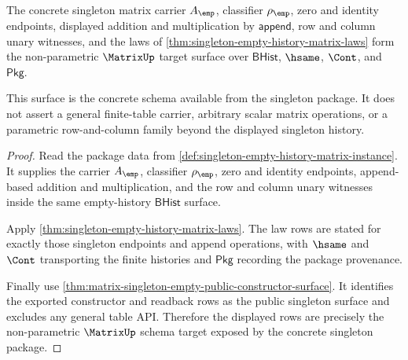 \begin{theorem}
\label{thm:matrix-singleton-concrete-schema-surface}
The concrete singleton matrix carrier $A_{\emp}$, classifier $\rho_{\emp}$,
zero and identity endpoints, displayed addition and multiplication by
$\mathsf{append}$, row and column unary witnesses, and the laws of
\autoref{thm:singleton-empty-history-matrix-laws} form the non-parametric
$\MatrixUp$ target surface over $\mathsf{BHist}$, $\hsame$, $\Cont$, and
$\mathsf{Pkg}$.

This surface is the concrete schema available from the singleton package. It
does not assert a general finite-table carrier, arbitrary scalar matrix
operations, or a parametric row-and-column family beyond the displayed singleton
history.
\end{theorem}
\begin{proof}
Read the package data from
\autoref{def:singleton-empty-history-matrix-instance}. It supplies the carrier
$A_{\emp}$, classifier $\rho_{\emp}$, zero and identity endpoints, append-based
addition and multiplication, and the row and column unary witnesses inside the
same empty-history $\mathsf{BHist}$ surface.

Apply \autoref{thm:singleton-empty-history-matrix-laws}. The law rows are stated
for exactly those singleton endpoints and append operations, with $\hsame$ and
$\Cont$ transporting the finite histories and $\mathsf{Pkg}$ recording the
package provenance.

Finally use
\autoref{thm:matrix-singleton-empty-public-constructor-surface}. It identifies
the exported constructor and readback rows as the public singleton surface and
excludes any general table API. Therefore the displayed rows are precisely the
non-parametric $\MatrixUp$ schema target exposed by the concrete singleton
package.
\end{proof}

